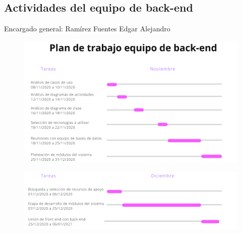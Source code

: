 \documentclass[12pt,letterpaper]{article}
\begin{document}
        \subsection{Actividades del equipo de back-end}
        Encargado general: Ramírez Fuentes Edgar Alejandro
            \begin{figure}[H]
                \centering
                \includegraphics [scale=0.6]{gantt/backNov}
            \end{figure}
            \begin{figure}[H]
                \centering
                \includegraphics [scale=0.6]{gantt/backDec}
            \end{figure}
        \newpage
\end{document}
